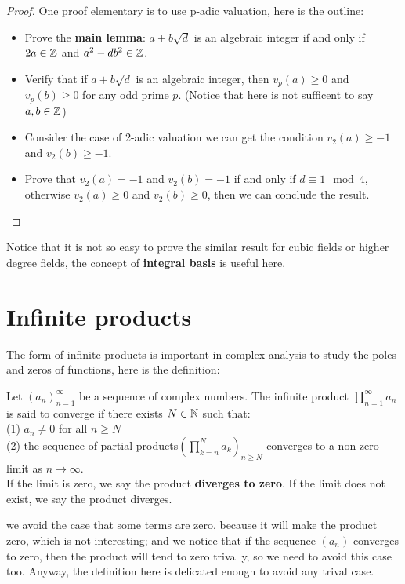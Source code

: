 \documentclass[12pt,a4paper]{article}
\begin{document}
\begin{proof}
    One proof elementary is to use p-adic valuation, here is the outline:
    \begin{itemize}
        \item Prove the \textbf{main lemma}: \(a+b\sqrt{d}\) is an algebraic integer if and only if \(2a \in \mathbb{Z}\) and \(a^2 - db^2 \in \mathbb{Z}\).
        \item Verify that if \(a+b\sqrt{d}\) is an algebraic integer, then \(v_p(a)\geq 0\) and \(v_p(b) \geq 0\) for any odd prime \(p\). (Notice that here is not sufficent to say \(a,b \in \mathbb{Z}\))
        \item Consider the case of 2-adic valuation we can get the condition \(v_2(a) \geq -1\) and \(v_2(b) \geq -1\).
        \item Prove that \(v_2(a) = -1 \) and \(v_2(b) = -1\) if and only if \(d \equiv 1 \mod 4\), otherwise \(v_2(a) \geq 0\) and \(v_2(b) \geq 0\), then we can conclude the result.
    \end{itemize}
\end{proof}
Notice that it is not so easy to prove the similar result for cubic fields or higher degree fields, the concept of \textbf{integral basis} is useful here.


\section{Infinite products}
The form of infinite products is important in complex analysis to study the poles and zeros of functions, here is the definition:

\begin{definition}
    Let \((a_n)_{n=1}^{\infty}\) be a sequence of complex numbers. The infinite product \(\prod_{n=1}^{\infty} a_n\) is said to converge if there exists \(N \in \mathbb{N}\) such that:\\
    (1) \(a_n \neq 0\) for all \(n \geq N\)\\
    (2) the sequence of partial products\((\prod_{k=n}^N a_k)_{n \geq N}\) converges to a non-zero limit as \(n \to \infty\).\\
If the limit is zero, we say the product \textbf{diverges to zero}. If the limit does not exist, we say the product diverges.
\end{definition}
we avoid the case that some terms are zero, because it will make the product zero, which is not interesting; and we notice that if the sequence \((a_n)\) converges to zero, then the product will tend to zero trivally, so we need to avoid this case too. Anyway, the definition here is delicated enough to avoid any trival case.
\end{document}
